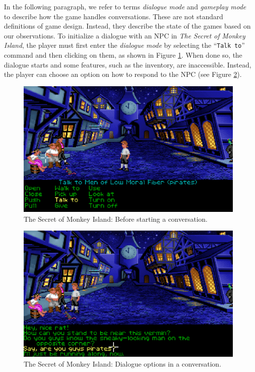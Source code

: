 In the following paragraph, we refer to terms \textit{dialogue mode} and \textit{gameplay mode} to describe how the game handles conversations. These are not standard definitions of game design. Instead, they describe the state of the games based on our observations. To initialize a dialogue with an NPC in \textit{The Secret of Monkey Island}, the player must first enter the \textit{dialogue mode} by selecting the “\texttt{Talk to}” command and then clicking on them, as shown in Figure \ref{fig:D-TSoMI0}. When done so, the dialogue starts and some features, such as the inventory, are inaccessible. Instead, the player can choose an option on how to respond to the NPC (see Figure \ref{fig:D-TSoMI1}). 

\begin{figure}[H]
\centering
\includegraphics[width=.8\linewidth]{img/D-TSoMI0.png}
\caption{The Secret of Monkey Island: Before starting a conversation.}
\label{fig:D-TSoMI0}
\end{figure}

\begin{figure}[H]
\centering
\includegraphics[width=.8\linewidth]{img/D-TSoMI1.png}
\caption{The Secret of Monkey Island: Dialogue options in a conversation.}
\label{fig:D-TSoMI1}
\end{figure}

